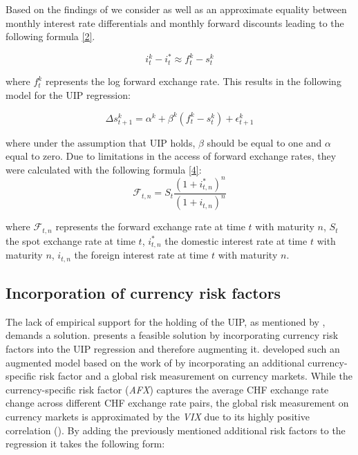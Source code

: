 \documentclass[a4paper,11pt,oneside]{article}
\begin{document}
Based on the findings of \cite{Akram and Rime and Sarno 2008} we consider as well as \cite{Grisse and Nitschka 2015} an approximate equality between monthly interest rate differentials and monthly forward discounts leading to the following formula \ref{2}.

\begin{equation}\label{2}
i_{t}^k-i_{t}^* \approx f_{t}^k-s_{t}^k
\end{equation}

where $f_{t}^k$ represents the log forward exchange rate. This results in the following model for the UIP regression:

\begin{equation}\label{3}
\Delta s_{t+1}^k=\alpha^k+\beta^k(f_{t}^k-s_{t}^k)+\epsilon_{t+1}^k
\end{equation}

where under the assumption that UIP holds, $\beta$ should be equal to one and $\alpha$ equal to zero. Due to limitations in the access of forward exchange rates, they were calculated with the following formula \ref{4}: 
\begin{equation}\label{4}
\mathcal{F}_{t,n}=S_{t}\frac{(1+i_{t,n}^*)^n}{(1+i_{t,n})^n}
\end{equation}

where $\mathcal{F}_{t,n}$ represents the forward exchange rate at time $t$ with maturity $n$, $S_{t}$ the spot exchange rate at time $t$, $i_{t,n}^*$ the domestic interest rate at time $t$ with maturity $n$, $i_{t,n}$ the foreign interest rate at time $t$ with maturity $n$. 

\subsection{Incorporation of currency risk factors}
The lack of empirical support for the holding of the UIP, as mentioned by \cite{Grisse and Nitschka 2015}, demands a solution. \cite{Verdelhan 2010} presents a feasible solution by incorporating currency risk factors into the UIP regression and therefore augmenting it. \cite{Grisse and Nitschka 2015} developed such an augmented model based on the work of \cite{Lustig and Roussanov and Verdelhan 2011} by incorporating an additional currency-specific risk factor and a global risk measurement on currency markets. While the currency-specific risk factor (\emph{AFX}) captures the average CHF exchange rate change across different CHF exchange rate pairs, the global risk measurement on currency markets is approximated by the \emph{VIX} due to its highly positive correlation (\cite{Grisse and Nitschka 2015}). By adding the previously mentioned additional risk factors to the regression it takes the following form:
\end{document}
